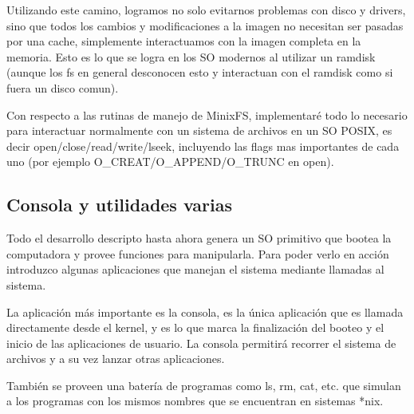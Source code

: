 Utilizando este camino, logramos no solo evitarnos problemas con disco y
drivers, sino que todos los cambios y modificaciones a la imagen no necesitan
ser pasadas por una cache, simplemente interactuamos con la imagen completa en
la memoria. Esto es lo que se logra en los SO modernos al utilizar un ramdisk
(aunque los fs en general desconocen esto y interactuan con el ramdisk como si
fuera un disco comun).

Con respecto a las rutinas de manejo de MinixFS, implementaré todo lo necesario
para interactuar normalmente con un sistema de archivos en un SO POSIX, es decir
open/close/read/write/lseek, incluyendo las flags mas importantes de cada uno
(por ejemplo O\_CREAT/O\_APPEND/O\_TRUNC en open).

\subsection{Consola y utilidades varias}

Todo el desarrollo descripto hasta ahora genera un SO primitivo que bootea la
computadora y provee funciones para manipularla. Para poder verlo en acción
introduzco algunas aplicaciones que manejan el sistema mediante llamadas al
sistema.

La aplicación más importante es la consola, es la única aplicación que es
llamada directamente desde el kernel, y es lo que marca la finalización del
booteo y el inicio de las aplicaciones de usuario. La consola permitirá recorrer
el sistema de archivos y a su vez lanzar otras aplicaciones.

También se proveen una batería de programas como ls, rm, cat, etc. que simulan a
los programas con los mismos nombres que se encuentran en sistemas *nix.
